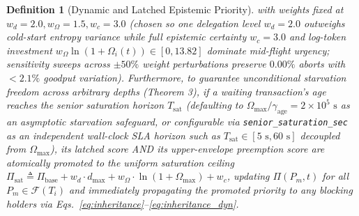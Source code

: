\documentclass[conference,10pt]{IEEEtran}
\newtheorem{definition}{Definition}
\begin{document}
\begin{definition}[Dynamic and Latched Epistemic Priority]
with weights fixed at $w_d = 2.0, w_\Omega = 1.5, w_c = 3.0$ (chosen so one delegation level $w_d = 2.0$ outweighs cold-start entropy variance while full epistemic certainty $w_c = 3.0$ and log-token investment $w_\Omega \ln(1+\Omega_i(t)) \in [0, 13.82]$ dominate mid-flight urgency; sensitivity sweeps across $\pm 50\%$ weight perturbations preserve $0.00\%$ aborts with $< 2.1\%$ goodput variation). Furthermore, to guarantee unconditional starvation freedom across arbitrary depths (Theorem 3), if a waiting transaction's age reaches the senior saturation horizon $T_{\text{sat}}$ (defaulting to $\Omega_{\max}/\gamma_{\text{age}} = 2\times 10^5\text{ s}$ as an asymptotic starvation safeguard, or configurable via \texttt{senior\_saturation\_sec} as an independent wall-clock SLA horizon such as $T_{\text{sat}} \in [5\text{ s}, 60\text{ s}]$ decoupled from $\Omega_{\max}$), its latched score AND its upper-envelope preemption score are atomically promoted to the uniform saturation ceiling $\Pi_{\text{sat}} \triangleq \Pi_{\text{base}} + w_d \cdot d_{\max} + w_\Omega \cdot \ln(1 + \Omega_{\max}) + w_c$, updating $\Pi(P_m, t)$ for all $P_m \in \mathcal{F}(T_i)$ and immediately propagating the promoted priority to any blocking holders via Eqs.~\eqref{eq:inheritance}--\eqref{eq:inheritance_dyn}.


\end{definition}
\end{document}
